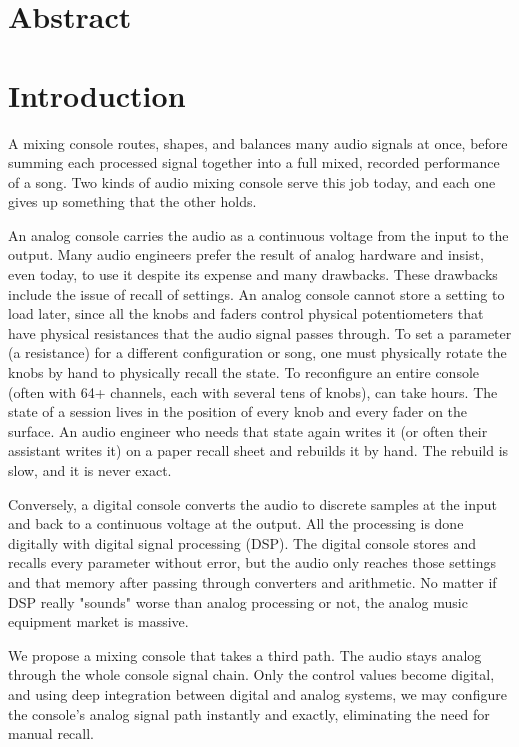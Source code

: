 \documentclass[11pt, letterpaper,titlepage]{article}
\begin{document}
\justify

\tableofcontents

\section{Abstract}

\newpage


\section{Introduction}
\label{sec:intro}

A mixing console routes, shapes, and balances many audio signals at once, before summing each processed signal together into a full mixed, recorded performance of a song. Two kinds of audio mixing console serve this job today, and each one gives up something that the other holds.

An analog console carries the audio as a continuous voltage from the input to
the output. Many audio engineers prefer the result of analog hardware and insist, even today, to use it despite its expense and many drawbacks. These drawbacks include the issue of recall of settings. An analog console cannot store a
setting to load later, since all the knobs and faders control physical potentiometers that have physical resistances that the audio signal passes through. To set a parameter (a resistance) for a different configuration or song, one must physically rotate the knobs by hand to physically recall the state. To reconfigure an entire console (often with 64+ channels, each with several tens of knobs), can take hours. The state of a session lives in the position of every knob and every fader on the surface. An audio engineer who needs that state again writes it (or often their assistant writes it) on a paper recall sheet and rebuilds it by hand. The rebuild is slow, and it is never exact.

Conversely, a digital console converts the audio to discrete samples at the input and back to a continuous
voltage at the output. All the processing is done digitally with digital signal processing (DSP). The digital console stores and recalls every parameter without error, but the
audio only reaches those settings and that memory after passing through converters and arithmetic. No matter if DSP really "sounds" worse than analog processing or not, the analog music equipment market is massive.

We propose a mixing console that takes a third path. The audio stays analog through the whole console signal chain. Only the control values become digital, and using deep integration between digital and analog systems, we may configure the console's analog signal path instantly and exactly, eliminating the need for manual recall.
\end{document}
